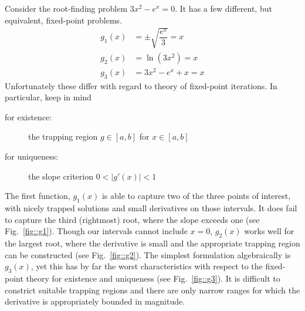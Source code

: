 \documentclass[11pt]{article}
\begin{document}
Consider the root-finding problem \(3x^2-e^x = 0\). It has a few different, but equivalent, fixed-point problems.
\begin{align}
g_1(x) & = \pm\sqrt{\dfrac{e^x}{3}} = x\\
g_2(x) & = \ln(3x^2) = x\\
g_3(x) & = 3x^2 - e^x + x = x
\end{align}
Unfortunately these differ with regard to theory of fixed-point iterations. In particular, keep in mind
\begin{description}
\item[for existence:] the trapping region \(g\in[a,b]\) for \(x\in[a,b]\)
\item[for uniqueness:] the slope criterion \(0<|g'(x)|<1\)
\end{description}

The first function, \(g_1(x)\) is able to capture two of the three points of interest, with nicely trapped solutions and small derivatives on those intervals. It does fail to capture the third (rightmost) root, where the slope exceeds one (see Fig.~\ref{fig::g1}). Though our intervals cannot include \(x=0\), \(g_2(x)\) works well for the largest root, where the derivative is small and the appropriate trapping region can be constructed (see Fig.~\ref{fig::g2}). The simplest formulation algebraically is \(g_3(x)\), yet this has by far the worst characteristics with respect to the fixed-point theory for existence and uniqueness (see Fig.~\ref{fig::g3}). It is difficult to constrict suitable trapping regions and there are only narrow ranges for which the derivative is appropriately bounded in magnitude. 
\end{document}
